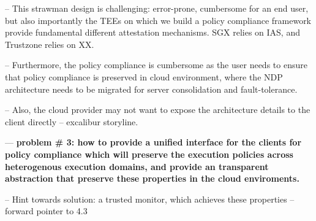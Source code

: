 -- This strawman design is challenging: error-prone, cumbersome for an end user, but also importantly the TEEs on which we build a policy compliance framework provide fundamental different attestation mechanisms. SGX relies on IAS, and Trustzone relies on XX.

-- Furthermore, the policy compliance is cumbersome as the user needs to ensure that policy compliance is preserved in cloud environment, where the NDP architecture needs to be migrated for server consolidation and fault-tolerance. 

-- Also, the cloud provider may not want to expose the architecture details to the client directly -- excalibur storyline.

--- {\bf problem \# 3: how to provide a unified interface for the clients for policy compliance which will preserve the execution policies across heterogenous execution domains, and provide an transparent abstraction that preserve these properties in the cloud enviroments.}


-- Hint towards solution: a trusted  monitor, which achieves these properties -- forward pointer to 4.3

\fi

